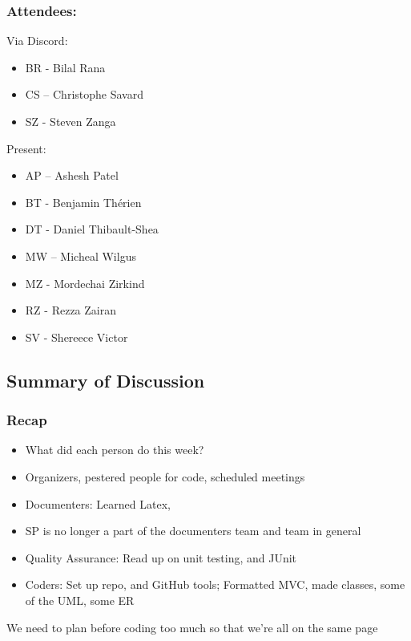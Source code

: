 \documentclass[12pt]{article}
\begin{document}
	\subsubsection{Attendees:}
		Via Discord:
		\begin{itemize}
		\item BR - Bilal Rana
		\item CS – Christophe Savard 
		\item SZ - Steven Zanga
		\end{itemize}
		Present: 
		\begin{itemize}
		\item AP – Ashesh Patel
		\item BT - Benjamin Th\'erien
		\item DT - Daniel Thibault-Shea
		\item MW – Micheal Wilgus
		\item MZ - Mordechai Zirkind  
		\item RZ - Rezza Zairan 
		\item SV - Shereece Victor 
		
		\end{itemize}
	
	\subsection{Summary of Discussion }
	\subsubsection{Recap }
	\begin{itemize}
		\item What did each person do this week?
		\item Organizers, pestered people for code, scheduled meetings 
		\item Documenters: Learned Latex, 
		\item SP is no longer a part of the documenters team and team in general 
		\item Quality Assurance: Read up on unit testing, and JUnit 
		\item Coders: Set up repo, and GitHub tools;	Formatted MVC, made classes, some of the UML, some ER 
	  
	\end{itemize}
	We need to plan before coding too much so that we’re all on the same page
	
\end{document}

